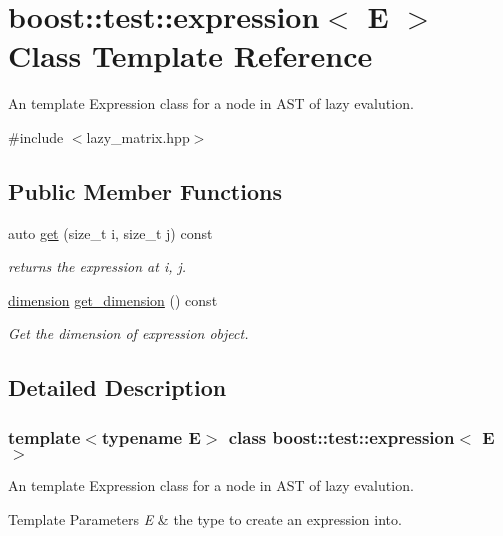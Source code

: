 \hypertarget{classboost_1_1test_1_1expression}{}\section{boost\+::test\+::expression$<$ E $>$ Class Template Reference}
\label{classboost_1_1test_1_1expression}


An template Expression class for a node in A\+ST of lazy evalution.  




{\ttfamily \#include $<$lazy\+\_\+matrix.\+hpp$>$}

\subsection*{Public Member Functions}
\begin{DoxyCompactItemize}
\item 
auto \mbox{\hyperlink{classboost_1_1test_1_1expression_a87b3b3d8e7b4f27ea12674769c4ee7f1}{get}} (size\+\_\+t i, size\+\_\+t j) const
\begin{DoxyCompactList}\small\item\em returns the expression at i, j. \end{DoxyCompactList}\item 
\mbox{\hyperlink{structboost_1_1test_1_1dimension}{dimension}} \mbox{\hyperlink{classboost_1_1test_1_1expression_a7eeb067f2e8df1a1932fb7101e6cc3f1}{get\+\_\+dimension}} () const
\begin{DoxyCompactList}\small\item\em Get the dimension of expression object. \end{DoxyCompactList}\end{DoxyCompactItemize}


\subsection{Detailed Description}
\subsubsection*{template$<$typename E$>$\newline
class boost\+::test\+::expression$<$ E $>$}

An template Expression class for a node in A\+ST of lazy evalution. 


\begin{DoxyTemplParams}{Template Parameters}
{\em E} & the type to create an expression into. \\
\hline
\end{DoxyTemplParams}


